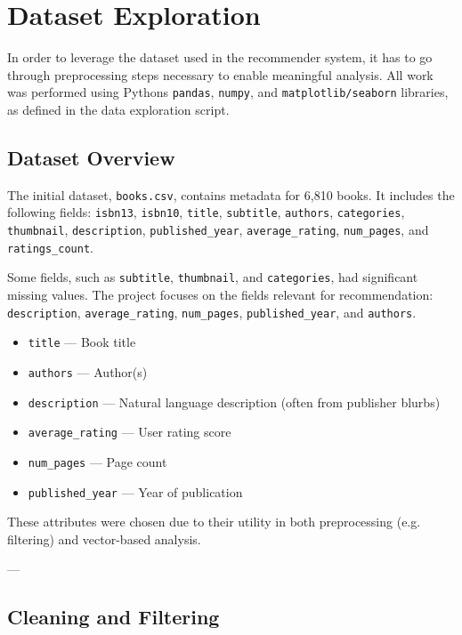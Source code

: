 \chapter{Dataset Exploration}
\label{chapter:dataset}

In order to leverage the dataset \cite{7k-books} used in the recommender system, it has to go through preprocessing steps necessary to enable meaningful analysis. 
All work was performed using Pythons \texttt{pandas}, \texttt{numpy}, and \texttt{matplotlib/seaborn} libraries, as defined in the data exploration script.

\section{Dataset Overview}
\label{sec:dataset-overview}

The initial dataset, \texttt{books.csv}, contains metadata for 6,810 books. It includes the following fields: \texttt{isbn13}, \texttt{isbn10}, \texttt{title}, \texttt{subtitle}, \texttt{authors}, \texttt{categories}, \texttt{thumbnail}, \texttt{description}, \texttt{published\_year}, \texttt{average\_rating}, \texttt{num\_pages}, and \texttt{ratings\_count}.

Some fields, such as \texttt{subtitle}, \texttt{thumbnail}, and \texttt{categories}, had significant missing values. The project focuses on the fields relevant for recommendation: \texttt{description}, \texttt{average\_rating}, \texttt{num\_pages}, \texttt{published\_year}, and \texttt{authors}.

\begin{itemize}
    \item \texttt{title} — Book title
    \item \texttt{authors} — Author(s)
    \item \texttt{description} — Natural language description (often from publisher blurbs)
    \item \texttt{average\_rating} — User rating score
    \item \texttt{num\_pages} — Page count
    \item \texttt{published\_year} — Year of publication
\end{itemize}

These attributes were chosen due to their utility in both preprocessing (e.g. filtering) and vector-based analysis.

---

\section{Cleaning and Filtering}
\label{sec:data-cleaning}

